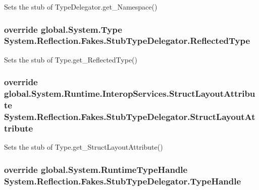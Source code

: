 Sets the stub of Type\-Delegator.\-get\-\_\-\-Namespace()

\hypertarget{class_system_1_1_reflection_1_1_fakes_1_1_stub_type_delegator_a51ad22304136530c7fab5985922850d9}{
\subsubsection[{Reflected\-Type}]{\setlength{\rightskip}{0pt plus 5cm}override global.\-System.\-Type System.\-Reflection.\-Fakes.\-Stub\-Type\-Delegator.\-Reflected\-Type\hspace{0.3cm}{\ttfamily [get]}}}\label{class_system_1_1_reflection_1_1_fakes_1_1_stub_type_delegator_a51ad22304136530c7fab5985922850d9}


Sets the stub of Type.\-get\-\_\-\-Reflected\-Type()

\hypertarget{class_system_1_1_reflection_1_1_fakes_1_1_stub_type_delegator_a5ff11ef027c04d56090e6d666a6d205d}{
\subsubsection[{Struct\-Layout\-Attribute}]{\setlength{\rightskip}{0pt plus 5cm}override global.\-System.\-Runtime.\-Interop\-Services.\-Struct\-Layout\-Attribute System.\-Reflection.\-Fakes.\-Stub\-Type\-Delegator.\-Struct\-Layout\-Attribute\hspace{0.3cm}{\ttfamily [get]}}}\label{class_system_1_1_reflection_1_1_fakes_1_1_stub_type_delegator_a5ff11ef027c04d56090e6d666a6d205d}


Sets the stub of Type.\-get\-\_\-\-Struct\-Layout\-Attribute()

\hypertarget{class_system_1_1_reflection_1_1_fakes_1_1_stub_type_delegator_a4872b47df4bbba669495f26fbc457b0f}{
\subsubsection[{Type\-Handle}]{\setlength{\rightskip}{0pt plus 5cm}override global.\-System.\-Runtime\-Type\-Handle System.\-Reflection.\-Fakes.\-Stub\-Type\-Delegator.\-Type\-Handle\hspace{0.3cm}{\ttfamily [get]}}}\label{class_system_1_1_reflection_1_1_fakes_1_1_stub_type_delegator_a4872b47df4bbba669495f26fbc457b0f}


